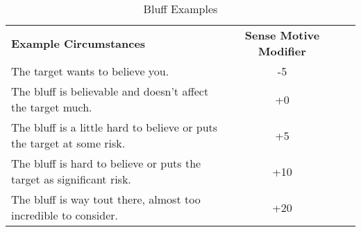 \begin{table}[htb]
\caption{Bluff Examples}
\centering
\begin{tabular}{l c l c}
\textbf{Example Circumstances} & \textbf{Sense Motive Modifier}\\
The target wants to believe you. & -5\\
The bluff is believable and doesn't affect the target much. & +0\\
The bluff is a little hard to believe or puts the target at some risk. & +5\\
The bluff is hard to believe or puts the target as significant risk. & +10\\
The bluff is way tout there, almost too incredible to consider. & +20\\
\end{tabular}
\end{table}